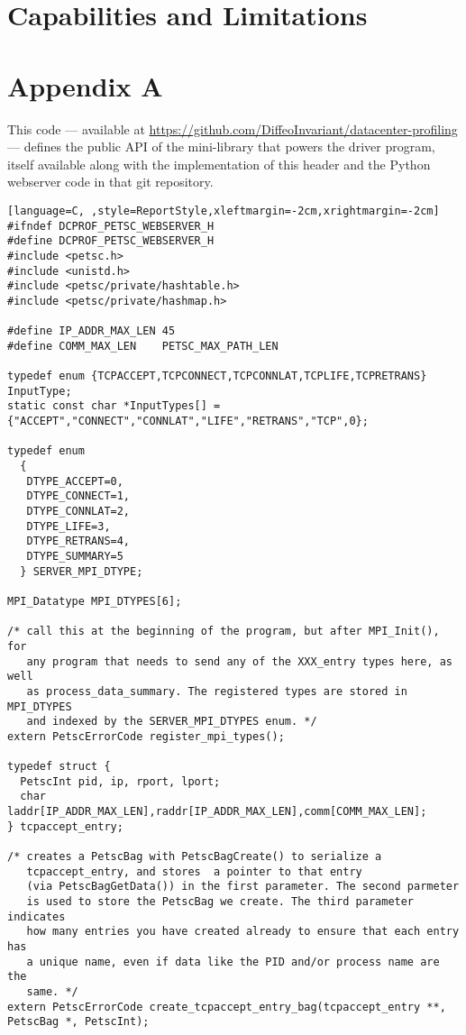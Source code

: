 \documentclass[11pt]{article}
\begin{document}
\section{Capabilities and Limitations}

\section*{Appendix A}
This code --- available at \url{https://github.com/DiffeoInvariant/datacenter-profiling} --- defines the public API of the mini-library that powers the driver program, itself available along with the implementation of this header and the Python webserver code in that git repository.
\begin{lstlisting}[language=C, ,style=ReportStyle,xleftmargin=-2cm,xrightmargin=-2cm]
#ifndef DCPROF_PETSC_WEBSERVER_H
#define DCPROF_PETSC_WEBSERVER_H
#include <petsc.h>
#include <unistd.h>
#include <petsc/private/hashtable.h>
#include <petsc/private/hashmap.h>

#define IP_ADDR_MAX_LEN 45
#define COMM_MAX_LEN    PETSC_MAX_PATH_LEN

typedef enum {TCPACCEPT,TCPCONNECT,TCPCONNLAT,TCPLIFE,TCPRETRANS} InputType;
static const char *InputTypes[] = {"ACCEPT","CONNECT","CONNLAT","LIFE","RETRANS","TCP",0};

typedef enum 
  {
   DTYPE_ACCEPT=0,
   DTYPE_CONNECT=1,
   DTYPE_CONNLAT=2,
   DTYPE_LIFE=3,
   DTYPE_RETRANS=4,
   DTYPE_SUMMARY=5
  } SERVER_MPI_DTYPE;

MPI_Datatype MPI_DTYPES[6];

/* call this at the beginning of the program, but after MPI_Init(), for 
   any program that needs to send any of the XXX_entry types here, as well
   as process_data_summary. The registered types are stored in MPI_DTYPES
   and indexed by the SERVER_MPI_DTYPES enum. */
extern PetscErrorCode register_mpi_types();

typedef struct {
  PetscInt pid, ip, rport, lport;
  char     laddr[IP_ADDR_MAX_LEN],raddr[IP_ADDR_MAX_LEN],comm[COMM_MAX_LEN];
} tcpaccept_entry;

/* creates a PetscBag with PetscBagCreate() to serialize a
   tcpaccept_entry, and stores  a pointer to that entry
   (via PetscBagGetData()) in the first parameter. The second parmeter
   is used to store the PetscBag we create. The third parameter indicates
   how many entries you have created already to ensure that each entry has
   a unique name, even if data like the PID and/or process name are the 
   same. */
extern PetscErrorCode create_tcpaccept_entry_bag(tcpaccept_entry **, PetscBag *, PetscInt);


\end{lstlisting}
\end{document}
